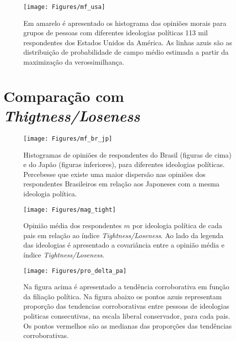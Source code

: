 \begin{figure}
\begin{center}
\texttt{[image: Figures/mf\_usa]}
\end{center}
\caption{Em amarelo é apresentado os histograma das opiniões morais para
grupos de pessoas com diferentes ideologias políticas 113 mil respondentes dos
Estados Unidos da América. As linhas azuis são as distribuição
de probabilidade de campo médio estimada a partir da maximização da
verossimilhança.
} 
\label{fig:mf_usa}
\end{figure}
                 

\section{Comparação com \textit{Thigtness/Loseness}}



\begin{figure}
\begin{center}
\texttt{[image: Figures/mf\_br\_jp]}
\end{center}
\caption{Histogramas de opiniões de respondentes do Brasil (figuras de cima)
    e do Japão (figuras inferiores), para diferentes ideologias
    políticas. Percebesse que existe uma maior dispersão nas opiniões dos
    respondentes Brasileiros em relação  aos Japoneses com a mesma ideologia
    política.
} 
\label{fig:}
\end{figure}

\begin{figure}
\begin{center}
\texttt{[image: Figures/mag\_tight]}
\end{center}
\caption{Opinião média dos respondentes $m$ por ideologia política de cada pais
em relação ao índice \textit{Tightness/Loseness}. Ao lado da legenda das
ideologias é apresentado a covariância entre a opinião média e índice
\textit{Tightness/Loseness}. }
\label{fig:m_tl}
\end{figure}

\begin{figure}
\begin{center}
\texttt{[image: Figures/pro\_delta\_pa]}
\end{center}
\caption{Na figura acima é apresentado a tendência corroborativa em função
da filiação política. Na figura abaixo os pontos azuis representam 
proporção das tendencias corroborativas entre pessoas de ideologias
politicas consecutivas, na escala liberal conservador, para cada pais. Os
pontos vermelhos são as medianas das proporções das tendências corroborativas.
} 
\label{fig:}
\end{figure}

